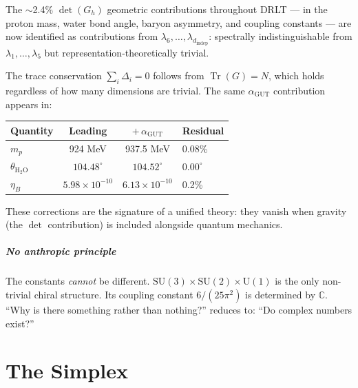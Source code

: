 \documentclass[12pt]{article}
\theoremstyle{remark}
\theoremstyle{definition}
\newcommand{\CC}{\mathbb{C}}
\newcommand{\tr}{\operatorname{Tr}}
\newcommand{\agut}{\alpha_{\mathrm{GUT}}}
\begin{document}
The $\sim$2.4\% $\det(G_h)$ geometric contributions throughout DRLT --- in the proton mass, water bond angle, baryon asymmetry, and coupling constants --- are now identified as contributions from $\lambda_6, \ldots, \lambda_{d_\text{indep}}$: spectrally indistinguishable from $\lambda_1, \ldots, \lambda_5$ but representation-theoretically trivial.

The trace conservation $\sum_i \Delta_i = 0$ follows from $\tr(G) = N$, which holds regardless of how many dimensions are trivial. The same $\agut$ contribution appears in:

\begin{center}
\begin{tabular}{lccl}
\hline
Quantity & Leading & $+\,\agut$ & Residual \\
\hline
$m_p$ & 924 MeV & 937.5 MeV & 0.08\% \\
$\theta_{\text{H}_2\text{O}}$ & $104.48^\circ$ & $104.52^\circ$ & $0.00^\circ$ \\
$\eta_B$ & $5.98 \times 10^{-10}$ & $6.13 \times 10^{-10}$ & 0.2\% \\
\hline
\end{tabular}
\end{center}

These corrections are the signature of a unified theory: they vanish when gravity (the $\det$ contribution) is included alongside quantum mechanics.

\subsubsection{No anthropic principle}

The constants \emph{cannot} be different. $\text{SU}(3)\times\text{SU}(2)\times\text{U}(1)$ is the only non-trivial chiral structure. Its coupling constant $6/(25\pi^2)$ is determined by $\CC$. ``Why is there something rather than nothing?'' reduces to: ``Do complex numbers exist?''


\part{The Simplex}


\end{document}
